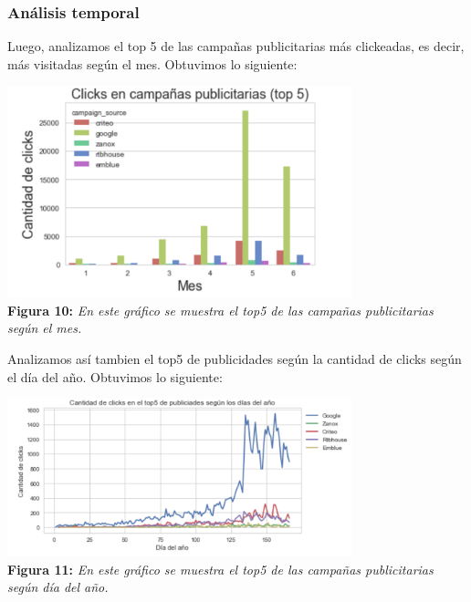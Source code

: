 \documentclass[titlepage,a4paper]{article}
\begin{document}
	\subsubsection{Análisis temporal}
	Luego, analizamos el top 5 de las campañas publicitarias más clickeadas, es decir, más visitadas según el mes. Obtuvimos lo siguiente: 
	\begin{center}
	\includegraphics[width=10cm] {top5campaniasPublicitariasMasImportantesSegunMes.jpg}\\
	\textbf{Figura 10:}  \textit{En este gráfico se muestra el top5 de las campañas publicitarias según el mes.  }
	\end{center}
	Analizamos así tambien el top5 de publicidades según la cantidad de clicks según el día del año. Obtuvimos lo siguiente:

	\begin{center}
	\includegraphics[width=10cm] {cantidadDeClicksSegunDiaDelAnio.jpg}\\
	\textbf{Figura 11:}  \textit{En este gráfico se muestra el top5 de las campañas publicitarias según día del año.  }
	\end{center}

	
	
	
\end{document}
